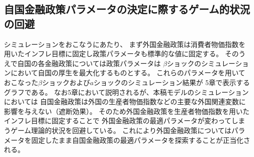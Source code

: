 \subsection{自国金融政策パラメータの決定に際するゲーム的状況の回避}
\label{sec:model_preparation_method_game_theory}
シミュレーションをおこなうにあたり、
まず外国金融政策は消費者物価指数を用いたインフレ目標に固定し政策パラメータも標準的な値に固定する。
そのうえで自国の各金融政策については政策パラメータは
\(\beta\)ショックのシミュレーションにおいて自国の厚生を最大化するものとする。
これらのパラメータを用いておこなった\(\beta\)ショックおよび\(a\)ショックのシミュレーション結果が
5章で表示するグラフである。
なお5章において説明されるが、本稿モデルのシミュレーションにおいては
自国金融政策は外国の生産者物価指数などの主要な外国関連変数に影響を与えない（遮断効果）。
そのため外国金融政策を生産者物価指数を用いたインフレ目標に固定することで
外国金融政策の最適パラメータが変わってしまうゲーム理論的状況を回避している。
これにより外国金融政策についてはパラメータを固定したまま自国金融政策の最適パラメータを探索することが正当化される。